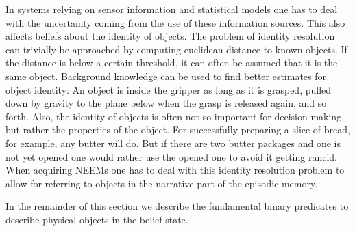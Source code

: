 
In systems relying on sensor information and statistical models one has to deal
with the uncertainty coming from the use of these information sources.
This also affects beliefs about the identity of objects.
The problem of identity resolution can trivially be approached
by computing euclidean distance to known objects.
If the distance is below a certain threshold, it can often be assumed that it is the same object.
Background knowledge can be used to find better estimates for object identity:
An object is inside the gripper as long as it is grasped,
pulled down by gravity to the plane below when the grasp is released again,
and so forth.
Also, the identity of objects is often not so important for decision making,
but rather the properties of the object.
For successfully preparing a slice of bread, for example, any butter will do.
But if there are two butter packages and one is not yet opened one would rather
use the opened one to avoid it getting rancid.
When acquiring NEEMs one has to deal with this identity resolution problem
to allow for referring to objects in the narrative part of the episodic memory.

In the remainder of this section we describe the fundamental binary predicates to
describe physical objects in the belief state.

